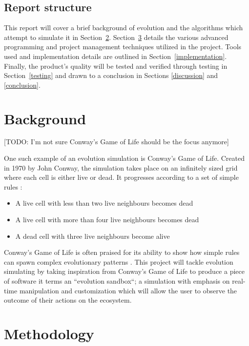 \documentclass[a4paper, oneside, 11pt]{report}
\begin{document}
\section{Report structure}
This report will cover a brief background of evolution and the algorithms which attempt to simulate it in Section~\ref{background}. Section~\ref{methodology} details the various advanced programming and project management techniques utilized in the project. Tools used and implementation details are outlined in Section~\ref{implementation}. Finally, the product's quality will be tested and verified through testing in Section~\ref{testing} and drawn to a conclusion in Sections \ref{discussion} and \ref{conclusion}.

\chapter{Background}\label{background}
[TODO: I'm not sure Conway's Game of Life should be the focus anymore]

One such example of an evolution simulation is Conway's Game of Life. Created in 1970 by John Conway, the simulation takes place on an infinitely sized grid where each cell is either live or dead. It progresses according to a set of simple rules \cite{guardian}:
\begin{itemize}
	\item A live cell with less than two live neighbours becomes dead
	\item A live cell with more than four live neighbours becomes dead
	\item A dead cell with three live neighbours become alive
\end{itemize}

Conway's Game of Life is often praised for its ability to show how simple rules can spawn complex evolutionary patterns \cite{callahan}. This project will tackle evolution simulating by taking inspiration from Conway's Game of Life to produce a piece of software it terms an ``evolution sandbox``; a simulation with emphasis on real-time manipulation and customization which will allow the user to observe the outcome of their actions on the ecosystem.

\chapter{Methodology}\label{methodology}
\end{document}
